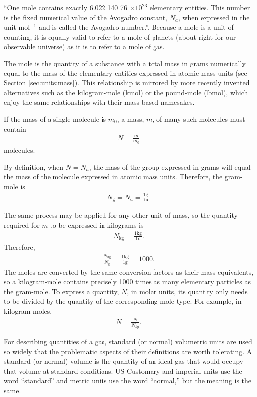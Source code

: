 ``One mole contains exactly 6.022 140 76 $\times 10^{23}$ elementary entities. This number is the fixed numerical value of the Avogadro constant, $N_a$, when expressed in the unit mol$^{-1}$ and is called the Avogadro number.''\cite{bipm}.  Because a mole is a unit of counting, it is equally valid to refer to a mole of planets (about right for our observable universe) as it is to refer to a mole of gas.

The mole is the quantity of a substance with a total mass in grams numerically equal to the mass of the elementary entities expressed in atomic mass units (see Section \ref{sec:units:mass}).  This relationship is mirrored by more recently invented alternatives such as the kilogram-mole (kmol) or the pound-mole (lbmol), which enjoy the same relationships with their mass-based namesakes.

If the mass of a single molecule is $m_0$, a mass, $m$, of many such molecules must contain
\begin{align}
N = \frac{m}{m_0}
\end{align}
molecules.

By definition, when $N = N_a$, the mass of the group expressed in grams will equal the mass of the molecule expressed in atomic mass units.  Therefore, the gram-mole is
\begin{align}
N_\mathrm{g} = N_a = \frac{1\mathrm{g}}{1\mathrm{u}}.
\end{align}

The same process may be applied for any other unit of mass, so the quantity required for $m$ to be expressed in kilograms is
\begin{align}
N_\mathrm{kg} = \frac{1\mathrm{kg}}{1\mathrm{u}}.
\end{align}
Therefore,
\begin{align}
\frac{N_\mathrm{kg}}{N_\mathrm{g}} = \frac{1 \mathrm{kg}}{1 \mathrm{g}} = 1000.
\end{align}
The moles are converted by the same conversion factors as their mass equivalents, so a kilogram-mole contains precisely 1000 times as many elementary particles as the gram-mole.  To express a quantity, $N$, in molar units, its quantity only needs to be divided by the quantity of the corresponding mole type.  For example, in kilogram moles,
\begin{align}
\overline{N} = \frac{N}{N_{kg}}.
\end{align}

For describing quantities of a gas, standard (or normal) volumetric units are used so widely that the problematic aspects of their definitions are worth tolerating.  A standard (or normal) volume is the quantity of an ideal gas that would occupy that volume at standard conditions.  US Customary and imperial units use the word ``standard'' and metric units use the word ``normal,'' but the meaning is the same.  

